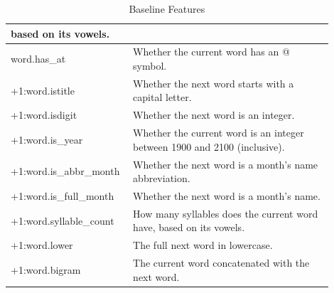 \begin{table}[ht]
\begin{tabular}{|p{0.3\linewidth}|p{0.6\linewidth}|}
      based on its vowels. \\
      \hline
      \rowcolor{blue}
      word.has\_at & Whether the current word has an @ symbol. \\
      \hline
      \rowcolor{light_blue}
      +1:word.istitle & Whether the next word starts with a capital letter. \\
      \hline
      \rowcolor{light_blue}
      +1:word.isdigit & Whether the next word is an integer. \\
      \hline
      \rowcolor{light_blue}
      +1:word.is\_year & Whether the current word is an integer between 1900
      and 2100 (inclusive). \\
      \hline
      \rowcolor{light_blue}
      +1:word.is\_abbr\_month & Whether the next word is a month's name
      abbreviation. \\
      \hline
      \rowcolor{light_blue}
      +1:word.is\_full\_month & Whether the next word is a month's name. \\
      \hline
      \rowcolor{light_blue}
      +1:word.syllable\_count & How many syllables does the current word have,
      based on its vowels. \\
      \hline
      \rowcolor{light_blue}
      +1:word.lower & The full next word in lowercase. \\
      \hline
      \rowcolor{light_blue}
      +1:word.bigram & The current word concatenated with the next word. \\
      \hline
    \end{tabular}
    \caption{Baseline Features}
    \label{table:1}
  \end{table}

